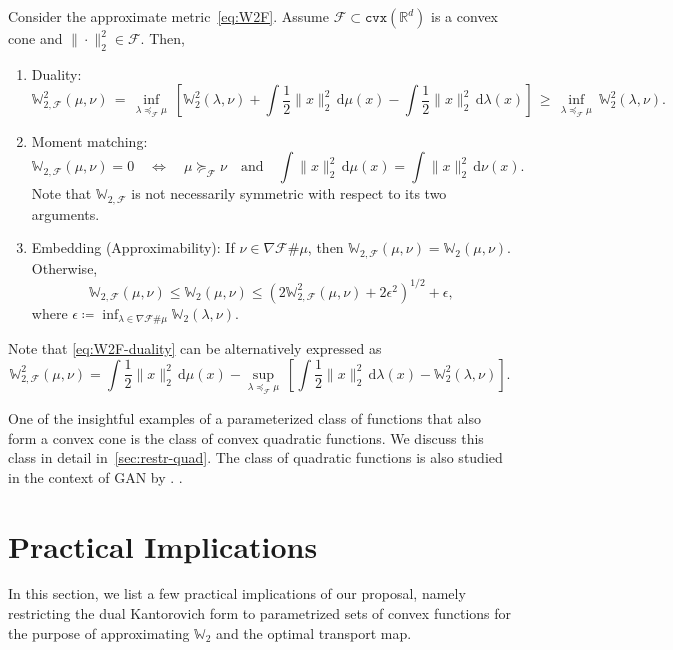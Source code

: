 \documentclass[10pt]{article}
\newcommand{\ud}{\,\mathrm{d}}
\newcommand{\norm}[1]{\|#1\|}
\newcommand{\cvx}{\mathtt{cvx}}
\newcommand{\real}{\mathbb{R}}
\newcommand{\W}{\mathds{W}}
\newcommand{\calF}{\mathcal{F}}
\numberwithin{equation}{section}
\begin{document}
\begin{theorem}\label{prop:conic-all}
Consider the approximate metric~\eqref{eq:W2F}. Assume $\calF \subset \cvx(\real^d) $ is a convex cone and $\norm{\cdot}_2^2 \in \calF$. Then,
\begin{enumerate}
		\item Duality:
\begin{equation}\label{eq:W2F-duality}
\W^2_{2,\calF}(\mu,\nu) 
\,=\, \inf_{\lambda \preceq_\calF \mu} ~\left[\W_2^2(\lambda,\nu) + \int \frac{1}{2}\norm{x}_2^2 \ud \mu(x) -\int \frac{1}{2}\norm{x}_2^2 \ud \lambda(x) \right] 
\,\geq\, \inf_{\lambda \preceq_\calF \mu}~\W_2^2(\lambda,\nu) .
\end{equation}
	\item Moment matching:
\begin{equation*}
\W_{2,\calF}(\mu,\nu) =0 \quad \iff \quad \mu \succeq_\calF \nu\quad \text{and}\quad \int \norm{x}_2^2\ud \mu(x) = \int \norm{x}_2^2\ud \nu(x).
\end{equation*}
Note that $\W_{2,\calF}$ is not necessarily symmetric with respect to its two arguments. 

\item Embedding (Approximability): If $\nu \in \nabla \calF \# \mu$, then $\W_{2,\calF}(\mu,\nu) = \W_2(\mu,\nu)$. Otherwise, 
\begin{equation*}
\W_{2,\calF}(\mu,\nu)\leq \W_{2}(\mu,\nu) \leq \left(2\W^2_{2,\calF}(\mu,\nu) + 2\epsilon^2 \right)^{1/2} +\epsilon ,
\end{equation*}
where $\epsilon \coloneqq \inf_{\lambda \in \nabla \calF\# \mu} \W_2(\lambda,\nu)$. 
\end{enumerate}
\end{theorem}
Note that \eqref{eq:W2F-duality} can be alternatively expressed as 
\[
\W^2_{2,\calF}(\mu,\nu) =\int \frac{1}{2}\norm{x}_2^2 \ud \mu(x) -
\sup_{\lambda \preceq_\calF \mu} ~\left[\int \frac{1}{2}\norm{x}_2^2 \ud \lambda(x) - \W_2^2(\lambda,\nu) \right]. 
\]

One of the insightful examples of a parameterized class of functions that also form a convex cone is the class of convex quadratic functions. We discuss this class in detail in~\autoref{sec:restr-quad}. The class of quadratic functions is also studied in the context of GAN by \citet{feizi2017understanding}. . 


\section{Practical Implications}\label{sec:practical}
In this section, we list a few practical implications of our proposal, namely restricting the dual Kantorovich form to parametrized sets of convex functions for the purpose of approximating $\W_2$ and the optimal transport map. 
\end{document}
